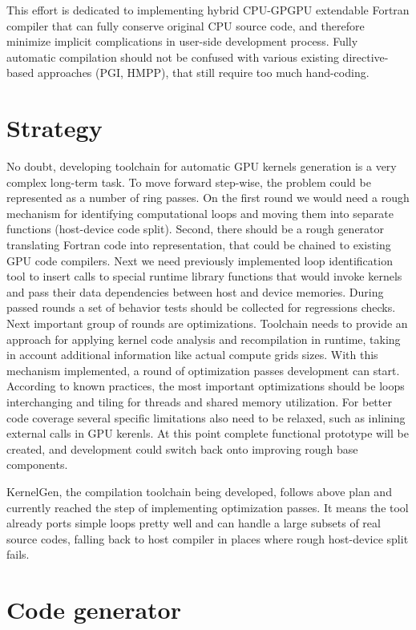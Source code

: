 \documentclass[a4,12pt]{article}
\begin{document}
This effort is dedicated to implementing hybrid CPU-GPGPU extendable Fortran compiler that can fully conserve original CPU source code, and therefore minimize implicit complications in user-side development process. Fully automatic compilation should not be confused with various existing directive-based approaches (PGI, HMPP), that still require too much hand-coding.

\section{Strategy}

No doubt, developing toolchain for automatic GPU kernels generation is a very complex long-term task. To move forward step-wise, the problem could be represented as a number of ring passes. On the first round we would need a rough mechanism for identifying computational loops and moving them into separate functions (host-device code split). Second, there should be a rough generator translating Fortran code into representation, that could be chained to existing GPU code compilers. Next we need previously implemented loop identification tool to insert calls to special runtime library functions that would invoke kernels and pass their data dependencies between host and device memories. During passed rounds a set of behavior tests should be collected for regressions checks. Next important group of rounds are optimizations. Toolchain needs to provide an approach for applying kernel code analysis and recompilation in runtime, taking in account additional information like actual compute grids sizes. With this mechanism implemented, a round of optimization passes development can start. According to known practices, the most important optimizations should be loops interchanging and tiling for threads and shared memory utilization. For better code coverage several specific limitations also need to be relaxed, such as inlining external calls in GPU kerenls. At this point complete functional prototype will be created, and development could switch back onto improving rough base components.

KernelGen, the compilation toolchain being developed, follows above plan and currently reached the step of implementing optimization passes. It means the tool already ports simple loops pretty well and can handle a large subsets of real source codes, falling back to host compiler in places where rough host-device split fails.

\section{Code generator}
\end{document}
